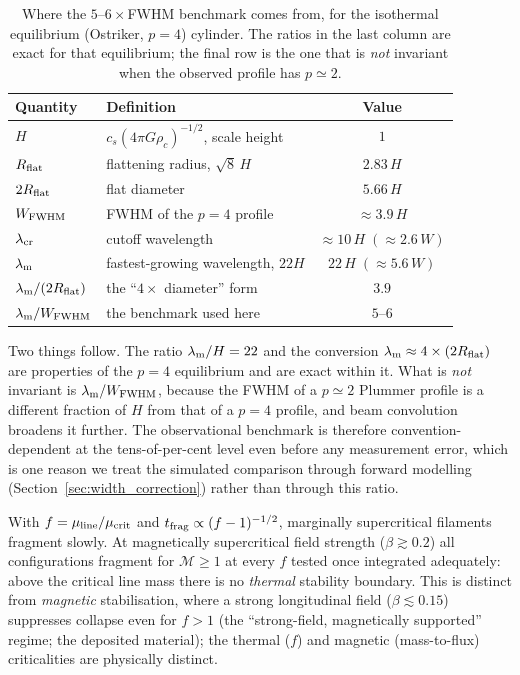 \documentclass[usenatbib,twoside,twocolumn]{mnras}
\begin{document}
\begin{table}
\caption{Where the $5$--$6\times$FWHM benchmark comes from, for the isothermal equilibrium (Ostriker, $p=4$) cylinder. The ratios in the last column are exact for that equilibrium; the final row is the one that is \emph{not} invariant when the observed profile has $p\simeq2$.}
\label{tab:benchmark}
\footnotesize
\setlength{\tabcolsep}{4pt}
\begin{tabular}{llc}
\toprule
Quantity & Definition & Value \\
\midrule
$H$ & $c_s(4\pi G\rho_c)^{-1/2}$, scale height & $1$ \\
$R_{\rm flat}$ & flattening radius, $\sqrt{8}\,H$ & $2.83\,H$ \\
$2R_{\rm flat}$ & flat diameter & $5.66\,H$ \\
$W_{\rm FWHM}$ & FWHM of the $p=4$ profile & $\approx3.9\,H$ \\
$\lambda_{\rm cr}$ & cutoff wavelength & $\approx10\,H\;(\approx2.6\,W)$ \\
$\lambda_{\rm m}$ & fastest-growing wavelength, $22H$ & $22\,H\;(\approx5.6\,W)$ \\
\midrule
$\lambda_{\rm m}/(2R_{\rm flat})$ & the ``$4\times$ diameter'' form & $3.9$ \\
$\lambda_{\rm m}/W_{\rm FWHM}$ & the benchmark used here & $5$--$6$ \\
\bottomrule
\end{tabular}
\end{table}

Two things follow. The ratio $\lambda_{\rm m}/H=22$ and the conversion $\lambda_{\rm m}\approx4\times(2R_{\rm flat})$ are properties of the $p=4$ equilibrium and are exact within it. What is \emph{not} invariant is $\lambda_{\rm m}/W_{\rm FWHM}$, because the FWHM of a $p\simeq2$ Plummer profile is a different fraction of $H$ from that of a $p=4$ profile, and beam convolution broadens it further. The observational benchmark is therefore convention-dependent at the tens-of-per-cent level even before any measurement error, which is one reason we treat the simulated comparison through forward modelling (Section~\ref{sec:width_correction}) rather than through this ratio.

With $f=\mu_{\rm line}/\mu_{\rm crit}$ and $t_{\rm frag}\propto(f-1)^{-1/2}$, marginally supercritical filaments fragment slowly. At magnetically supercritical field strength ($\beta\gtrsim0.2$) all configurations fragment for $\mathcal{M}\geq1$ at every $f$ tested once integrated adequately: above the critical line mass there is no \emph{thermal} stability boundary. This is distinct from \emph{magnetic} stabilisation, where a strong longitudinal field ($\beta\lesssim0.15$) suppresses collapse even for $f>1$ (the ``strong-field, magnetically supported'' regime; the deposited material); the thermal ($f$) and magnetic (mass-to-flux) criticalities are physically distinct.
\end{document}
